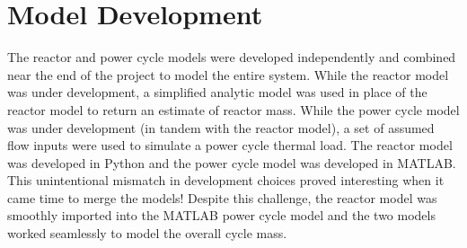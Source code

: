 \section{Model Development}
The reactor and power cycle models were developed independently and combined
near the end of the project to model the entire system. While the reactor model
was under development, a simplified analytic model was used in place of the
reactor model to return an estimate of reactor mass. While the power cycle model
was under development (in tandem with the reactor model), a set of assumed flow
inputs were used to simulate a power cycle thermal load. The reactor model was
developed in Python and the power cycle model was developed in MATLAB. This
unintentional mismatch in development choices proved interesting when it came
time to merge the models! Despite this challenge, the reactor model was smoothly
imported into the MATLAB power cycle model and the two models worked seamlessly
to model the overall cycle mass.
